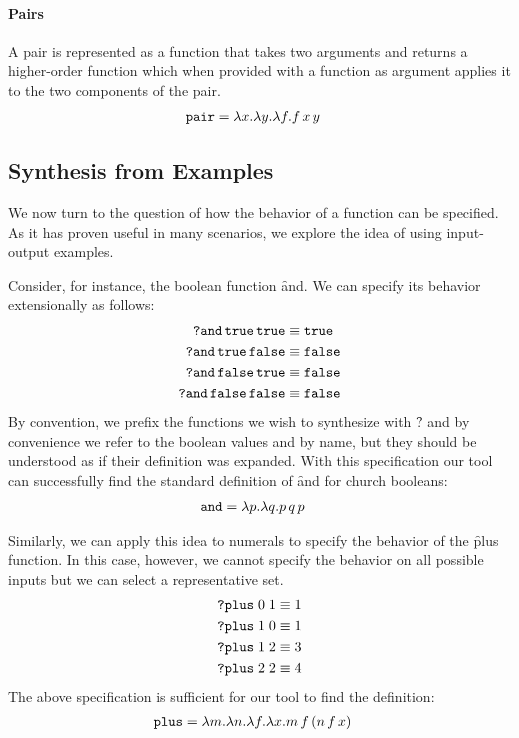\paragraph{Pairs}
%
A pair is represented as a function that takes two arguments
and returns a higher-order function which when provided with
a function as argument applies it to the two components of
the pair.
%
\begin{align*}
  \texttt{pair} &= \lambda x. \lambda y. \lambda f.f\,x\,y
\end{align*}

\subsection{Synthesis from Examples} \label{sec:io}
%
We now turn to the question of how the behavior of a
function can be specified.
%
As it has proven useful in many scenarios, we explore the
idea of using input-output examples.

Consider, for instance, the boolean function \f{and}.
We can specify its behavior extensionally as follows:
%
\begin{align*}
\texttt{?and}\,\texttt{true}\,\texttt{true}    &\equiv \texttt{true} \\
\texttt{?and}\,\texttt{true}\,\texttt{false}   &\equiv \texttt{false} \\
\texttt{?and}\,\texttt{false}\,\texttt{true}   &\equiv \texttt{false} \\
\texttt{?and}\,\texttt{false}\, \texttt{false} &\equiv \texttt{false} \\
\end{align*}
%
By convention, we prefix the functions we wish to synthesize
with \f{?} and by convenience we refer to the boolean values
\true and \false by name, but they should be understood as
if their definition was expanded.
%
With this specification our tool can successfully find the
standard definition of \f{and} for church booleans:
%
\begin{align}
  \label{eq:and-def}
  \texttt{and} &= \lambda p. \lambda q. p\,q\,p
\end{align}

Similarly, we can apply this idea to numerals to specify the
behavior of the \f{plus} function.
%
In this case, however, we cannot specify the behavior on all
possible inputs but we can select a representative set.
%
\begin{align*}
  \texttt{?plus}\; 0\; 1 &\equiv 1\\
  \texttt{?plus}\; 1\; 0 &\equiv 1\\
  \texttt{?plus}\; 1\; 2 &\equiv 3\\
  \texttt{?plus}\; 2\; 2 &\equiv 4\\
\end{align*}
%
The above specification is sufficient for our tool to find
the definition:
%
\begin{align}
  \label{eq:plus-def}
  \texttt{plus} &= \lambda m. \lambda n. \lambda f. \lambda x. m\,f\,(n\,f\,x)
\end{align}




